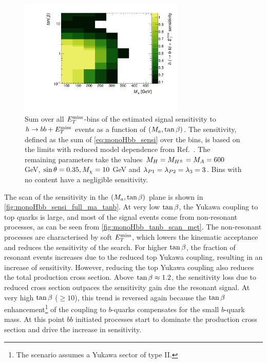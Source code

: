 \begin{figure}[tbp]
\centering
\includegraphics[width=0.7\textwidth]{texinputs/04_grid/figures/monoHbb_sensi_sum_bins_1_2_3_4_ma_vs_tanb_lin.pdf}
\caption[Sensitivity to $h\to bb + \MET$ signals in $\mA$ - $\tanb$ plane, summed across $\MET$ bins]
{
Sum over all $\MET$-bins of the estimated signal sensitivity to $h\to bb + \MET$ events as a function of $(M_{a},\tan\beta)$. 
The sensitivity, defined as the sum of \autoref{eq:monoHbb_sensi} over the \met bins, is based on the limits with reduced model dependence from Ref.~\cite{Aaboud:2017yqz}. 
The remaining parameters take the values $ M_{H}=M_{H^{\pm}}=M_{A} = 600$ GeV, $ \sin\theta = 0.35, M_{\chi} = 10$ GeV and $ \lambda_{P1} = \lambda_{P2} = \lambda_{3} = 3 $. Bins with no content have a negligible sensitivity.}
\label{fig:monoHbb_sensi_full_ma_tanb}
\end{figure}

The scan of the sensitivity in the  $(M_{a},\tan\beta)$ plane is shown in  \autoref{fig:monoHbb_sensi_full_ma_tanb}. 
At very low $\tanb$, the Yukawa coupling to top quarks is large, and most of the signal events come from non-resonant processes, as can be seen from \autoref{fig:monoHbb_tanb_scan_met}. %
The non-resonant processes are characterised by soft $\MET$, which lowers the kinematic acceptance and reduces the sensitivity of the search.
For higher $\tanb$, the fraction of resonant events increases due to the reduced top Yukawa coupling, resulting in an increase of sensitivity.
However, reducing the top Yukawa coupling also reduces the total production cross section. 
Above $\tan\beta \approx 1.2$, the sensitivity loss due to reduced cross section outpaces the sensitivity gain due the resonant signal.
At very high $\tanb$ ($\geq 10$), this trend is reversed again because the $\tanb$ enhancement\footnote{The \hdma scenario assumes a Yukawa sector of type II.} of the coupling to $b$-quarks compensates for the small $b$-quark mass.
At this point $bb$ initiated processes start to dominate the production cross section and drive the increase in sensitivity.

